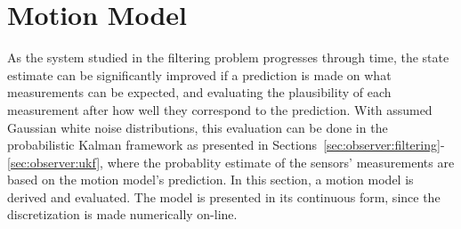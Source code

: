 \section{Motion Model}
\label{sec:observer:motionmodel}
    As the system studied in the filtering problem progresses through time,
    the state estimate can be significantly improved if a prediction
    is made on what measurements can be expected, and evaluating the plausibility
    of each measurement after how well they correspond to the prediction.
    With assumed Gaussian white noise distributions, this evaluation
    can be done in the probabilistic Kalman framework as presented in
    Sections~\ref{sec:observer:filtering}-\ref{sec:observer:ukf}, where the
    probablity estimate of the sensors' measurements are based on the motion
    model's prediction. In this section, a motion model is derived and evaluated.
    The model is presented in its continuous form, since the discretization
    is made numerically on-line.

